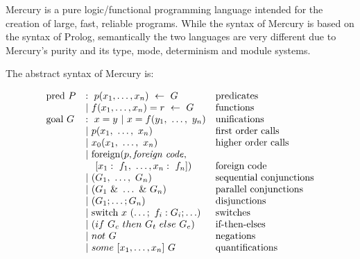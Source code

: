 
Mercury is a pure logic/functional programming language
intended for the creation of large, fast, reliable programs.
While the syntax of Mercury is based on the syntax of Prolog,
semantically the two languages are very different
due to Mercury's purity and its type, mode, determinism and module systems.

The abstract syntax of Mercury is:

$$
\begin{array}{lll}
\mbox{pred}~P
    & :~ p(x_1, \ldots, x_n)~\leftarrow~G
        & \hbox{predicates} \\
    & |~ f(x_1, \ldots, x_n)=r~\leftarrow~G
        & \hbox{functions} \\
\mbox{goal}~G
    & :~ x = y ~|~ x = f(y_1,~\ldots,~y_n)
        & \hbox{unifications}\\
    & |~ p(x_1,~\ldots,~x_n)
        & \hbox{first order calls} \\
    & |~ x_0(x_1,~\ldots,~x_n)
        & \hbox{higher order calls} \\
    & |~ \hbox{foreign}(p, \hbox{\emph{foreign code}},
        & \\
    & ~~~ [x_1:~f_1,~\ldots,x_n:~f_n])
        & \hbox{foreign code} \\
    & |~ (G_1,~\ldots,~G_n)
        & \hbox{sequential conjunctions}\\
    & |~ (G_1~\&~\ldots~\&~G_n)
        & \hbox{parallel conjunctions}\\
    & |~ (G_1 ; \ldots ; G_n)
        & \hbox{disjunctions}\\
    & |~ \hbox{switch}~x~(\ldots;~f_i: G_i ; \ldots)
        & \hbox{switches}\\
    & |~ (if~G_c~then~G_t~else~G_e)
        & \hbox{if-then-elses}\\
    & |~ not~G
        & \hbox{negations}\\
    & |~ some~[x_1,\ldots,x_n]~G
        & \hbox{quantifications}\\
\end{array}
$$
\label{fig:abstractsyntax}

